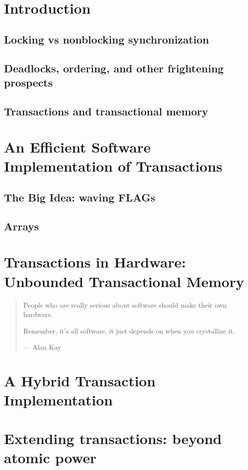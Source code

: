 \documentclass{phd-thesis}
\author{C. Scott Ananian}
\title{\subtitle}
\date{\subdate \\ $ $Revision: 1.3 $ $}
\begin{document}

\frontmatter


\mainmatter
\chapter{Introduction}
\section{Locking vs nonblocking synchronization}
\section{Deadlocks, ordering, and other frightening prospects}
\section{Transactions and transactional memory}


\chapter{An Efficient Software Implementation of Transactions}
\section{The Big Idea: waving FLAGs}
\section{Arrays}
\chapter{Transactions in Hardware: Unbounded Transactional Memory}
\begin{quote}
People who are really serious about software should make their own hardware.

Remember, it's all software, it just depends on when you crystallize
it. 

 --- Alan Kay

\end{quote}


\chapter{A Hybrid Transaction Implementation}

\chapter{Extending transactions: beyond atomic power}
\end{document}

